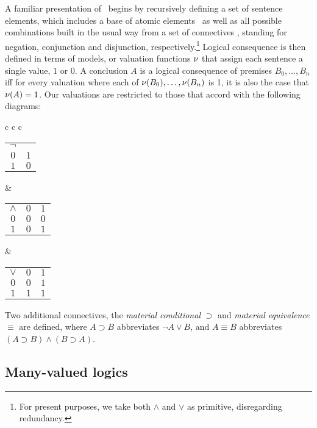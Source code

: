 	A familiar presentation of \CPL\ begins by recursively defining a set of sentence elements, which includes a base of atomic elements \ as well as all possible combinations built in the usual way from a set of connectives \set{\neg,\wedge,\vee}, standing for negation, conjunction and disjunction, respectively.\footnote{For present purposes, we take both $\wedge$ and $\vee$ as primitive, disregarding redundancy.}
 Logical consequence is then defined in terms of models, or valuation functions $\mathcal{\nu}$ that assign each sentence a single value, $1$ or $0$. A conclusion $A$ is a logical consequence of premises $B_0,\dots,B_n$ iff for every valuation where each of $\mathcal{\nu}({B_0}), \dots, \mathcal{\nu}({B_n})$ is 1, it is also the case that $\mathcal{\nu}({A}) = 1$. Our valuations are restricted to those that accord with the following diagrams:
\begin{singlespace}
	\begin{longtable}{c c c }
		\begin{tabular}{c | c}
			$\neg$ 	&  			\\
			\cline{1-2} 
			$0$		& 	$1$ 	\\ 
			$1$ 	& 	$0$ 	\\
		\end{tabular} 
		&
		\begin{tabular}{c | c c }
			$\wedge$ 	& $0$ & $1$	\\
			\cline{1-3}
			$0$			& $0$ & $0$ \\
			$1$			& $0$ & $1$ \\
		\end{tabular}
		&
		\begin{tabular}{c | c c }
			$\vee$ 		& $0$ & $1$	\\
			\cline{1-3}
			$0$			& $0$ & $1$ \\
			$1$			& $1$ & $1$ \\
		\end{tabular}
		
	\end{longtable}
\end{singlespace}
\noindent Two additional connectives, the \emph{material conditional} $\supset$ and \emph{material equivalence} $\equiv$ are defined, where $A \supset B$ abbreviates $\neg A \vee B$, and $A \equiv B$ abbreviates $(A \supset B) \wedge (B \supset A)$.

	\subsection{Many-valued logics}\label{manyValuedLogics}
	
